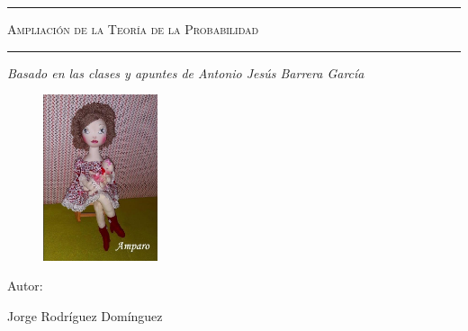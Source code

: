 \begin{titlepage}
    \centering
    {\bfseries\LARGE \ \par}
    \vspace{1cm}
    {\scshape\Large \ \par}
    \vspace{3cm}
    \rule{\linewidth}{0.5mm}
    {\scshape\Huge Ampliación de la Teoría de la Probabilidad \par}
    \rule{\linewidth}{0.5mm} \par
    \vspace{3cm}
    {\itshape\Large Basado en las clases y apuntes de Antonio Jesús Barrera García \par}
    \vfill
    \begin{figure}[H]
        \centering
        \includegraphics[width=0.3\textwidth]{amparo.jpeg}
    \end{figure}
    {\Large Autor: \par}
    {\Large Jorge Rodríguez Domínguez \par}
    \vfill
\end{titlepage}
\tableofcontents